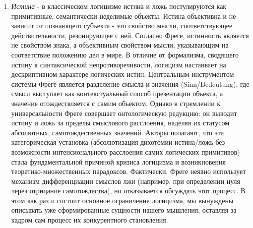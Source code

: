 \documentclass[12pt]{article}
\begin{document}
\begin{enumerate}
    \item {\it Истина} - в классическом логицизме истина и ложь постулируются как примитивные, семантически неделимые объекты. Истина объективна и не зависит от познающего субъекта - это свойство мысли, соответствующее действительности, резонирующее с ней. Согласно Фреге, истинность является не свойством знака, а объективным свойством мысли, указывающим на соответствие положению дел в мире. В отличие от формализма, сводящего истину к синтаксической непротиворечивости, логицизм настаивает на дескриптивном характере логических истин. Центральным инструментом системы Фреге является разделение смысла и значения (Sinn/Bedeutung), где смысл выступает как контекстуальный способ презентации объекта, а значение отождествляется с самим объектом. Однако в стремлении к универсальности Фреге совершает онтологическую редукцию: он выводит истину и ложь за пределы смыслового расслоения, наделяя их статусом абсолютных, самотождественных значений. Авторы полагают, что эта категорическая установка (абсолютизация дихотомии истина/ложь без возможности интенсионального расслоения самих логических примитивов) стала фундаментальной причиной кризиса логицизма и возникновения теоретико-множественных парадоксов. Фактически, Фреге неявно использует механизм дифференциации смыслов лжи (например, при определении нуля через отрицание самотождества), но отказывается обсуждать этот процесс. В этом как раз и состоит основное ограничение логицизма, мы вынуждены описывать уже сформированные сущности нашего мышления, оставляя за кадром сам процесс их конкурентного становления.

\end{enumerate}
\end{document}
